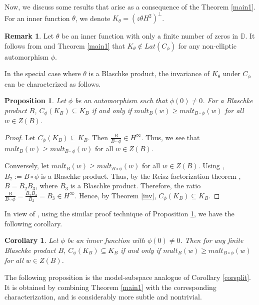 \documentclass[12pt, reqno]{amsart}
\newtheorem{proposition}[theorem]{Proposition}
\newtheorem{corollary}[theorem]{Corollary}
\theoremstyle{definition}
\newtheorem{remark}[theorem]{Remark}
\numberwithin{equation}{section}
\begin{document}
Now, we discuss some results that arise as a consequence of the Theorem \ref{main1}.
For an inner function $\theta$, we denote $K_{\theta}=(z\theta H^2)^\perp$.
\begin{remark}
	Let $\theta $ be an inner function with only a finite number of zeros in $\mathbb{D}$. It follows from \cite[Theorem 5.17]{article1} and Theorem \ref{main1} that $
	K_{\theta}\notin Lat(C_\phi)$ for any non-elliptic automorphism $\phi$.
\end{remark}



In the special case where $\theta$ is a Blaschke product, the invariance of $K_\theta$ under $C_\phi$ can be characterized as follows.

\begin{proposition}\label{bl}
	Let $\phi$ be an automorphism such that $\phi(0)\neq 0$. For a Blaschke product $B$, $C_\phi(K_B)\subseteq K_B$ if and only if $ {mult}_{B}(w)\geq {mult}_{B\circ \phi}(w)$ for all $w\in Z(B)$.                  
\end{proposition} 

\begin{proof}
	Let $C_\phi(K_B)\subseteq K_B$. Then $\frac{B}{B\circ\phi} \in H^{\infty}$. Thus, we see that $ {mult}_{B}(w)\geq {mult}_{B\circ \phi}(w)$ for all $w\in Z(B)$. 
	
	Conversely, let  $ {mult}_{B}(w)\geq {mult}_{B\circ \phi}(w)$ for all $w\in Z(B)$. Using \cite[Proposition 3.7]{article1}, $B_2:=B\circ\phi$ is a Blaschke product. Thus, by the Reisz factorization theorem \cite[Theorem 2.5]{duren}, $B=B_2B_3$, where $B_3$ is a Blaschke product. Therefore, the ratio $\frac{B}{B\circ \phi}=\frac{B_2B_3}{B_2}=B_3 \in H^\infty$. Hence, by Theorem \ref{inv}, $C_\phi(K_B)\subseteq K_B$.
\end{proof}
 In view of \cite[Proposition 3.7]{article1}, using the similar proof technique of Proposition \ref{bl}, we have the following corollary.
\begin{corollary}
	Let $\phi$ be an inner function with $\phi(0)\neq 0$. Then for any finite Blaschke product $B$, $C_\phi(K_B)\subseteq K_B$ if and only if $ {mult}_{B}(w)\geq {mult}_{B\circ \phi}(w)$ for all $w\in Z(B)$.                  
\end{corollary}

The following proposition is the model-subspace analogue of Corollary \ref{corsplit}. It is obtained by combining Theorem \ref{main1} with the corresponding characterization, and is considerably more subtle and nontrivial.
\end{document}
